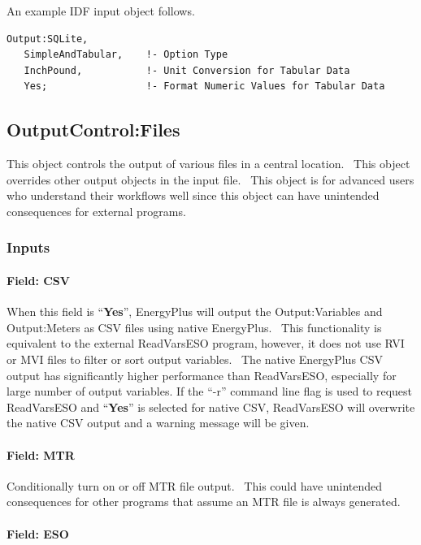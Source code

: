 An example IDF input object follows.
\begin{lstlisting}
Output:SQLite,
   SimpleAndTabular,    !- Option Type
   InchPound,           !- Unit Conversion for Tabular Data
   Yes;                 !- Format Numeric Values for Tabular Data
\end{lstlisting}

\subsection{OutputControl:Files}\label{outputcontrolfiles}

This object controls the output of various files in a central location.~ This object overrides other output objects in the input file.~ This object is for advanced users who understand their workflows well since this object can have unintended consequences for external programs.

\subsubsection{Inputs}\label{outputcontrolfiles-inputs}

\paragraph{Field: CSV}\label{field-csv}

When this field is ``\textbf{Yes}'', EnergyPlus will output the Output:Variables and Output:Meters as CSV files using native EnergyPlus.~ This functionality is equivalent to the external ReadVarsESO program, however, it does not use RVI or MVI files to filter or sort output variables.~ The native EnergyPlus CSV output has significantly higher performance than ReadVarsESO, especially for large number of output variables. If the ``-r'' command line flag is used to request ReadVarsESO and ``\textbf{Yes}'' is selected for native CSV, ReadVarsESO will overwrite the native CSV output and a warning message will be given.

\paragraph{Field: MTR}\label{field-mtr}

Conditionally turn on or off MTR file output.~ This could have unintended consequences for other programs that assume an MTR file is always generated.

\paragraph{Field: ESO}\label{field-eso}


